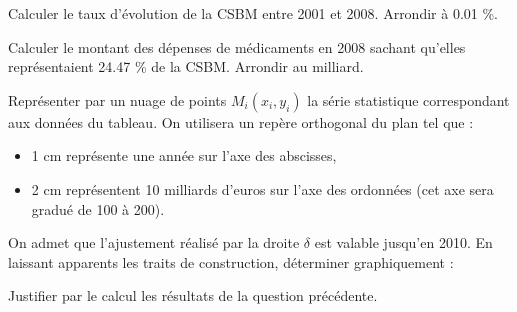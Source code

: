 \begin{questions}
	\question[1] Calculer le taux d'évolution de la CSBM entre 2001 et 2008. Arrondir à \num{0.01} \%.
	
	\question[1] Calculer le montant des dépenses de médicaments en 2008 sachant qu'elles représentaient \num{24.47}  \% de la CSBM. Arrondir au milliard.
	
	\question[2] Représenter par un nuage de points $M_i(x_i, y_i)$ la série statistique correspondant aux données du tableau. On utilisera un repère orthogonal du plan tel que :
	\begin{itemize}
		\item 1 cm représente une année sur l'axe des abscisses,
		
		\item 2 cm représentent 10 milliards d'euros sur l'axe des ordonnées (cet axe sera gradué de 100 à 200).
		
	\end{itemize}

	\question[5] 
	
		\question[3] On admet que l'ajustement réalisé par la droite $\delta$ est valable jusqu'en 2010. En laissant apparents les traits de construction, déterminer graphiquement :
		
		\question[2] Justifier par le calcul les résultats de la question précédente.
\end{questions}